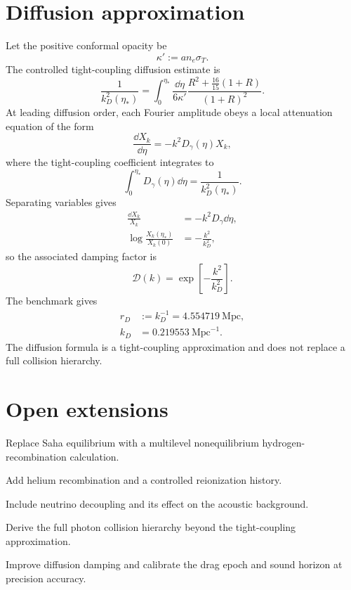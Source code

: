 \section{Diffusion approximation}
Let the positive conformal opacity be
\begin{equation}
\kappa':=a n_e\sigma_T.
\end{equation}
The controlled tight-coupling diffusion estimate is
\begin{equation}
\boxed{
\frac1{k_D^2(\eta_*)}
=
\int_0^{\eta_*}
\frac{\dd\eta}{6\kappa'}
\frac{R^2+\frac{16}{15}(1+R)}{(1+R)^2}.
}
\end{equation}
At leading diffusion order, each Fourier amplitude obeys a local attenuation equation of the form
\begin{equation}
\frac{\dd X_k}{\dd\eta}
=-k^2D_\gamma(\eta)X_k,
\end{equation}
where the tight-coupling coefficient integrates to
\begin{equation}
\int_0^{\eta_*}D_\gamma(\eta)\dd\eta
=\frac1{k_D^2(\eta_*)}.
\end{equation}
Separating variables gives
\begin{align}
\frac{\dd X_k}{X_k}&=-k^2D_\gamma\dd\eta,\\
\log\frac{X_k(\eta_*)}{X_k(0)}
&=-\frac{k^2}{k_D^2},
\end{align}
so the associated damping factor is
\begin{equation}
\mathcal D(k)=\exp\left[-\frac{k^2}{k_D^2}\right].
\end{equation}
The benchmark gives
\begin{align}
r_D&:=k_D^{-1}=4.554719\ \mathrm{Mpc},\\
k_D&=0.219553\ \mathrm{Mpc}^{-1}.
\end{align}
The diffusion formula is a tight-coupling approximation and does not replace a full collision hierarchy.

\section{Open extensions}
\begin{nextsteps}
\item Replace Saha equilibrium with a multilevel nonequilibrium hydrogen-recombination calculation.
\item Add helium recombination and a controlled reionization history.
\item Include neutrino decoupling and its effect on the acoustic background.
\item Derive the full photon collision hierarchy beyond the tight-coupling approximation.
\item Improve diffusion damping and calibrate the drag epoch and sound horizon at precision accuracy.
\end{nextsteps}

